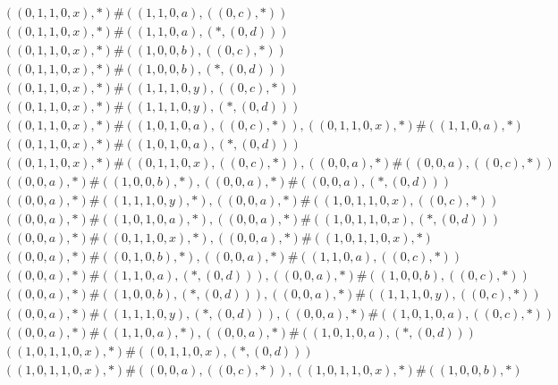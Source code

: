 \begin{align*}
	 & \qquad ((0, 1, 1, 0, x), *) \# ((1, 1, 0, a), ((0, c), *)) \\ 
	 & \qquad ((0, 1, 1, 0, x), *) \# ((1, 1, 0, a), (*, (0, d))) \\ 
	 & \qquad ((0, 1, 1, 0, x), *) \# ((1, 0, 0, b), ((0, c), *)) \\ 
	 & \qquad ((0, 1, 1, 0, x), *) \# ((1, 0, 0, b), (*, (0, d))) \\ 
	 & \qquad ((0, 1, 1, 0, x), *) \# ((1, 1, 1, 0, y), ((0, c), *)) \\ 
	 & \qquad ((0, 1, 1, 0, x), *) \# ((1, 1, 1, 0, y), (*, (0, d))) \\ 
	 & \qquad ((0, 1, 1, 0, x), *) \# ((1, 0, 1, 0, a), ((0, c), *)), ((0, 1, 1, 0, x), *) \# ((1, 1, 0, a), *) \\ 
	 & \qquad ((0, 1, 1, 0, x), *) \# ((1, 0, 1, 0, a), (*, (0, d))) \\ 
	 & \qquad ((0, 1, 1, 0, x), *) \# ((0, 1, 1, 0, x), ((0, c), *)), ((0, 0, a), *) \# ((0, 0, a), ((0, c), *)) \\ 
	 & \qquad ((0, 0, a), *) \# ((1, 0, 0, b), *), ((0, 0, a), *) \# ((0, 0, a), (*, (0, d))) \\ 
	 & \qquad ((0, 0, a), *) \# ((1, 1, 1, 0, y), *), ((0, 0, a), *) \# ((1, 0, 1, 1, 0, x), ((0, c), *)) \\ 
	 & \qquad ((0, 0, a), *) \# ((1, 0, 1, 0, a), *), ((0, 0, a), *) \# ((1, 0, 1, 1, 0, x), (*, (0, d))) \\ 
	 & \qquad ((0, 0, a), *) \# ((0, 1, 1, 0, x), *), ((0, 0, a), *) \# ((1, 0, 1, 1, 0, x), *) \\ 
	 & \qquad ((0, 0, a), *) \# ((0, 1, 0, b), *), ((0, 0, a), *) \# ((1, 1, 0, a), ((0, c), *)) \\ 
	 & \qquad ((0, 0, a), *) \# ((1, 1, 0, a), (*, (0, d))), ((0, 0, a), *) \# ((1, 0, 0, b), ((0, c), *)) \\ 
	 & \qquad ((0, 0, a), *) \# ((1, 0, 0, b), (*, (0, d))), ((0, 0, a), *) \# ((1, 1, 1, 0, y), ((0, c), *)) \\ 
	 & \qquad ((0, 0, a), *) \# ((1, 1, 1, 0, y), (*, (0, d))), ((0, 0, a), *) \# ((1, 0, 1, 0, a), ((0, c), *)) \\ 
	 & \qquad ((0, 0, a), *) \# ((1, 1, 0, a), *), ((0, 0, a), *) \# ((1, 0, 1, 0, a), (*, (0, d))) \\ 
	 & \qquad ((1, 0, 1, 1, 0, x), *) \# ((0, 1, 1, 0, x), (*, (0, d))) \\ 
	 & \qquad ((1, 0, 1, 1, 0, x), *) \# ((0, 0, a), ((0, c), *)), ((1, 0, 1, 1, 0, x), *) \# ((1, 0, 0, b), *) \\ 

\end{align*}
